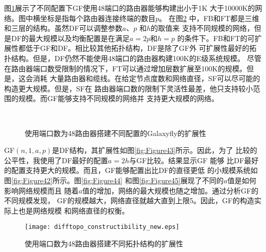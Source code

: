 图\ref{fig:Figure4}展示了不同配置下GF使用48端口的路由器能够构建出小于1K
大于10000K的网络。图中横坐标是指每个路由器连接终端的数目$p$。
在图\ref{fig:Figure3}
中，FB和FT都是三维和三层的结构。虽然DF可以调整参数$a$、$p$ 和$h$的取值来
支持不同规模的网络，但是DF的最大规模以及均衡配置是在满足$a = 2p$和$h = p$
的条件下。FB和FT的可扩展性都低于GF和DF。相比较其他拓扑结构，DF是除了GF外
可扩展性最好的拓扑结构。但是，DF仍然不能使用48端口的路由器构建100K的E级系统规模。
尽管在路由器端口数受限制的情况下，FT可以通过增加层数扩展至100K的规模。但是，这会消耗
大量路由器和缆线。在给定节点度数和网络直径，SF可以尽可能的构造更大规模。但是，SF在
路由器端口数的限制下灵活性最差，他只支持较小范围的规模。而GF能够支持不同规模的网络并
支持更大规模的网络。
\begin{figure}[t]
  \centering
  \begin{minipage}[t]{\textwidth}
   \centering
     \\

   \caption{使用端口数为48路由器搭建不同配置的Galaxyfly的扩展性}
  \label{fig:Figure4}
  \end{minipage}
\end{figure}


GF$(n,1,a,p)$是DF结构，其扩展性如图\ref{fig:Figure43}所示。因此，为了
比较的公平性，我使用了DF最好的配置$a=2h$与GF比较。结果显示GF 能够
比DF最好的配置支持更大的规模。而且，GF能够配置出比DF的直径更低
的小规模系统如图\ref{fig:Figure42}所示。图\ref{fig:Figure44}
和图\ref{fig:Figure45}展现了不同的$a$值是如何影响网络规模而且
随着$a$值的增加，网络的最大规模也随之增加。通过分析GF的不同规模发现，
GF的规模越大，网络直径就越大直到上限5。因此，GF的构造实际上也是网络规模
和网络直径的权衡。

\begin{figure}[t]
  \centering
  \texttt{[image: difftopo\_constructibility\_new.eps]}\\
  \caption{使用端口数为48路由器搭建不同拓扑结构的扩展性}
  \label{fig:Figure3}
\end{figure}

